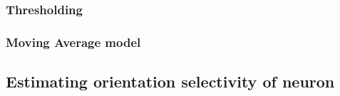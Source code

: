 \documentclass[11pt]{article}
\begin{document}
\subsubsection{Thresholding } %
\label{ssub:thresholding}



\subsubsection{Moving Average model} %
\label{ssub:moving_average_model}



\subsection{Estimating orientation selectivity of neuron} %
\label{sub:estimating_orientation_selectivity_of_neuron}
\end{document}
